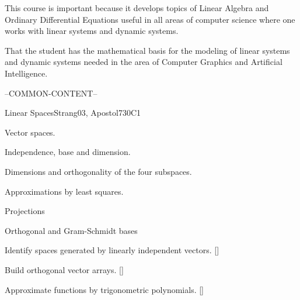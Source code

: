 \begin{syllabus}


\begin{justification}
   This course is important because it develops topics of Linear Algebra and Ordinary Differential Equations useful in all areas of computer science where one works with linear systems and dynamic systems.
\end{justification}

\begin{goals}
\item That the student has the mathematical basis for the modeling of linear systems and dynamic systems needed in the area of Computer Graphics and Artificial Intelligence.
\end{goals}

--COMMON-CONTENT--

\begin{unit}{}{Linear Spaces}{Strang03, Apostol73}{0}{C1}
\begin{topics}
      \item Vector spaces.
      \item Independence, base and dimension.
      \item Dimensions and orthogonality of the four subspaces.
      \item Approximations by least squares.
      \item Projections
      \item Orthogonal and Gram-Schmidt bases
   \end{topics}
   \begin{learningoutcomes}
      \item Identify spaces generated by linearly independent vectors. [\Usage]
      \item Build orthogonal vector arrays. [\Usage]
      \item Approximate functions by trigonometric polynomials. [\Usage]
   \end{learningoutcomes}
\end{unit}


\end{syllabus}
